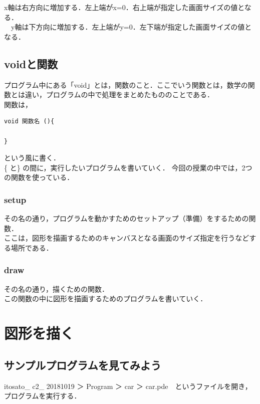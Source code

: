 \documentclass[a4j]{jarticle}
\begin{document}
x軸は右方向に増加する．左上端がx=0．右上端が指定した画面サイズの値となる．\\
　y軸は下方向に増加する．左上端がy=0．左下端が指定した画面サイズの値となる．\\

\subsection{voidと関数}
プログラム中にある「void」とは，関数のこと．ここでいう関数とは，数学の関数とは違い，プログラムの中で処理をまとめたもののことである．\\
関数は，
\begin{screen}
\begin{verbatim}
void 関数名 (){

}
\end{verbatim}
\end{screen}
という風に書く．\\
\{ と\} の間に，実行したいプログラムを書いていく． 
今回の授業の中では，2つの関数を使っている．
\subsubsection{setup}
その名の通り，プログラムを動かすためのセットアップ（準備）をするための関数．\\
ここは，図形を描画するためのキャンバスとなる画面のサイズ指定を行うなどする場所である．

\subsubsection{draw}
その名の通り，描くための関数．\\
この関数の中に図形を描画するためのプログラムを書いていく．

\section{図形を描く}
\subsection{サンプルプログラムを見てみよう}
itosato\_ c2\_ 20181019 ＞ Program ＞ car ＞ car.pde　というファイルを開き，プログラムを実行する．
\end{document}
